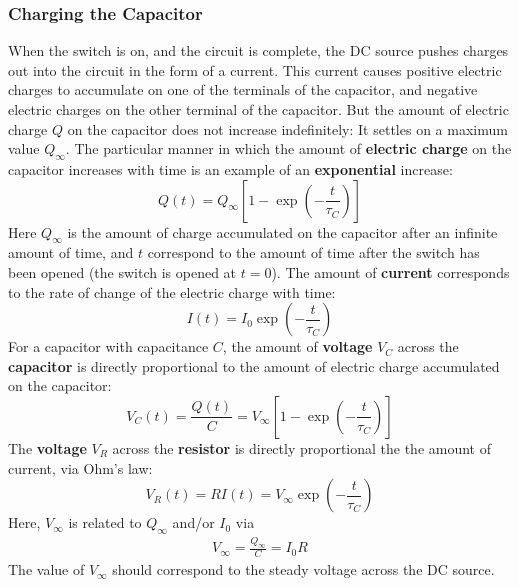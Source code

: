 \subsubsection{Charging the Capacitor}
When the switch is on, and the circuit is complete, the DC source pushes charges out into the circuit in the form of a current. This current causes positive electric charges to accumulate on one of the terminals of the capacitor, and negative electric charges on the other terminal of the capacitor. But the amount of electric charge $Q$ on the capacitor does not increase indefinitely: It settles on a maximum value $Q_{\infty}$. The particular manner in which the amount of \textbf{electric charge} on the capacitor increases with time is an example of an \textbf{exponential} increase:
\begin{equation}
    Q(t) = Q_{\infty} \left[ 1 - \exp\left(-\frac{t}{\tau_{C}}\right) \right]
    \label{eq.05.RC.q.charging}
\end{equation}
Here $Q_{\infty}$ is the amount of charge accumulated on the capacitor after an infinite amount of time, and $t$ correspond to the amount of time after the switch has been opened (the switch is opened at $t = 0$). The amount of \textbf{current} corresponds to the rate of change of the electric charge with time:
\begin{equation}
    I(t) = I_{0} \exp\left(-\frac{t}{\tau_{C}}\right)
    \label{eq.05.RC.i.charging}
\end{equation}
For a capacitor with capacitance $C$, the amount of \textbf{voltage} $V_{C}$ across the \textbf{capacitor} is directly proportional to the amount of electric charge accumulated on the capacitor:
\begin{equation}
    V_{C}(t) = \frac{Q(t)}{C} = V_{\infty} \left[ 1 - \exp\left(-\frac{t}{\tau_{C}}\right) \right]
    \label{eq.05.RC.vC.charging}
\end{equation}
The \textbf{voltage} $V_{R}$ across the \textbf{resistor} is directly proportional the the amount of current, via Ohm's law:
\begin{equation}
    V_{R}(t) = R I(t) = V_{\infty} \exp\left(-\frac{t}{\tau_{C}}\right)
    \label{eq.05.RC.vR.charging}
\end{equation}
Here, $V_{\infty}$ is related to $Q_{\infty}$ and/or $I_{0}$ via
\begin{eqnarray}
    V_{\infty} = \frac{Q_{\infty}}{C} = I_{0} R
\end{eqnarray}
The value of $V_{\infty}$ should correspond to the steady voltage across the DC source.

